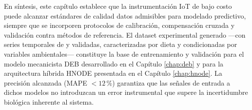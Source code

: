 En síntesis, este capítulo establece que la instrumentación IoT de
bajo costo puede alcanzar estándares de calidad datos admisibles para
modelado predictivo, siempre que se incorporen protocolos de
calibración, compensación cruzada y validación contra métodos de
referencia. El dataset experimental generado ---con series temporales
de  y  validadas, caracterizadas por dieta y
condicionadas por variables ambientales--- constituye la base de
entrenamiento y validación para el modelo mecanicista DEB desarrollado
en el Capítulo \ref{chap:deb} y para la arquitectura híbrida HNODE
presentada en el Capítulo \ref{chap:hnode}. La precisión alcanzada
(MAPE $< 12$\,\%) garantiza que las señales de entrada a dichos modelos
no introduzcan un error instrumental que supere la incertidumbre
biológica inherente al sistema.
